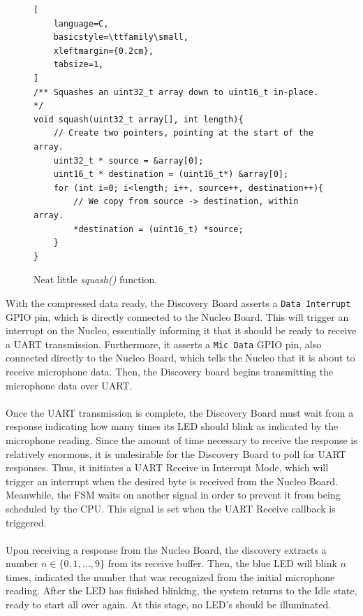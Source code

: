 \begin{figure}[h]
\begin{lstlisting}[
	language=C,
	basicstyle=\ttfamily\small,
	xleftmargin={0.2cm},
	tabsize=1,
]
/** Squashes an uint32_t array down to uint16_t in-place. */
void squash(uint32_t array[], int length){
	// Create two pointers, pointing at the start of the array.
	uint32_t * source = &array[0];
	uint16_t * destination = (uint16_t*) &array[0];
	for (int i=0; i<length; i++, source++, destination++){
		// We copy from source -> destination, within array.
		*destination = (uint16_t) *source;
	}
}
\end{lstlisting}
\caption{\label{fig:squash}Neat little \textit{squash()} function.}
\end{figure}







With the compressed data ready, the Discovery Board asserts a \texttt{Data Interrupt} GPIO pin,
which is directly connected to the Nucleo Board. This will trigger an interrupt on the Nucleo,
essentially informing it that it should be ready to receive a UART transmission. Furthermore, it
asserts a \texttt{Mic Data} GPIO pin, also connected directly to the Nucleo Board, which tells the
Nucleo that it is about to receive microphone data. Then, the Discovery
board begins transmitting the microphone data over UART.\\\\
Once the UART transmission is complete, the Discovery Board must wait from a response indicating how
many times its LED should blink as indicated by the microphone reading. Since the amount of time
necessary to receive the response is relatively enormous, it is undesirable for the Discovery Board
to poll for UART responses. Thus, it initiates a UART Receive in Interrupt Mode, which will trigger
an interrupt when the desired byte is received from the Nucleo Board. Meanwhile, the FSM waits on
another signal in order to prevent it from being scheduled by the CPU. This signal is set when the
UART Receive callback is triggered.\\\\
Upon receiving a response from the Nucleo Board, the discovery extracts a number
$n\in\{0,1,\dots,9\}$ from its receive buffer. Then, the blue LED will blink $n$ times, indicated
the number that was recognized from the initial microphone reading. After the LED has finished
blinking, the system returns to the Idle state, ready to start all over again. At this stage, no
LED's should be illuminated.
